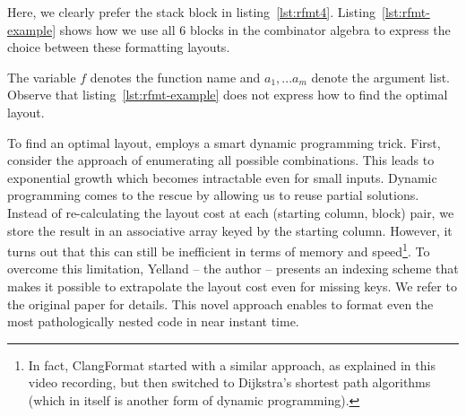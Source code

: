 Here, we clearly prefer the stack block in listing~\ref{lst:rfmt4}.
Listing~\ref{lst:rfmt-example} shows how we use all 6 blocks in the \rfmt{} combinator algebra to express the choice between these formatting layouts.

The variable $f$ denotes the function name and $a_1, ... a_m$ denote the argument list.
Observe that listing~\ref{lst:rfmt-example} does not express how to find the optimal layout.

To find an optimal layout, \rfmt{} employs a smart dynamic programming trick.
First, consider the \naive{} approach of enumerating all possible combinations.
This leads to exponential growth which becomes intractable even for small inputs.
Dynamic programming comes to the rescue by allowing us to reuse partial solutions.
Instead of re-calculating the layout cost at each (starting column, block) pair, we store the result in an associative array keyed by the starting column.
However, it turns out that this can still be inefficient in terms of memory and speed\footnote{
  In fact, ClangFormat started with a similar approach, as explained in this\autocite{clang84:online} video recording, but then switched to Dijkstra's shortest path algorithms (which in itself is another form of dynamic programming).
}.
To overcome this limitation, Yelland -- the \rfmt{} author -- presents an indexing scheme that makes it possible to extrapolate the layout cost even for missing keys.
We refer to the original paper\autocite{yelland_new_2016} for details.
This novel approach enables \rfmt{} to format even the most pathologically nested code in near instant time.


